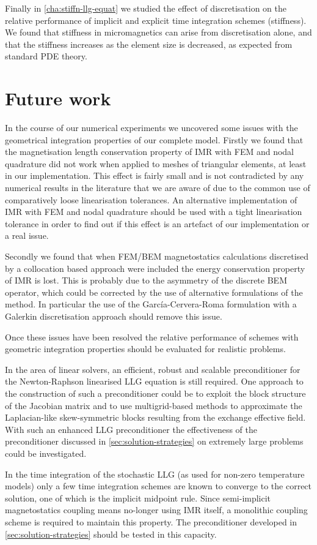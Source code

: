 Finally in \cref{cha:stiffn-llg-equat} we studied the effect of discretisation on the relative performance of implicit and explicit time integration schemes (stiffness).
We found that stiffness in micromagnetics can arise from discretisation alone, and that the stiffness increases as the element size is decreased, as expected from standard PDE theory.



\section{Future work}


In the course of our numerical experiments we uncovered some issues with the geometrical integration properties of our complete model.
Firstly we found that the magnetisation length conservation property of IMR with FEM and nodal quadrature did not work when applied to meshes of triangular elements, at least in our implementation.
This effect is fairly small and is not contradicted by any numerical results in the literature that we are aware of due to the common use of comparatively loose linearisation tolerances.
An alternative implementation of IMR with FEM and nodal quadrature should be used with a tight linearisation tolerance in order to find out if this effect is an artefact of our implementation or a real issue.

Secondly we found that when FEM/BEM magnetostatics calculations discretised by a collocation based approach were included the energy conservation property of IMR is lost.
This is probably due to the asymmetry of the discrete BEM operator, which could be corrected by the use of alternative formulations of the method.
In particular the use of the Garc\'{i}a-Cervera-Roma formulation \cite{Garcia-Cervera2006} with a Galerkin discretisation approach \cite[75]{Wrobel2002} should remove this issue.

Once these issues have been resolved the relative performance of schemes with geometric integration properties should be evaluated for realistic problems.

In the area of linear solvers, an efficient, robust and scalable preconditioner for the Newton-Raphson linearised LLG equation is still required.
One approach to the construction of such a preconditioner could be to exploit the block structure of the Jacobian matrix and to use multigrid-based methods to approximate the Laplacian-like skew-symmetric blocks resulting from the exchange effective field.
With such an enhanced LLG preconditioner the effectiveness of the preconditioner discussed in \cref{sec:solution-strategies} on extremely large problems could be investigated.

In the time integration of the stochastic LLG (as used for non-zero temperature models)
only a few time integration schemes are known to converge to the correct solution, one of which is the implicit midpoint rule.
Since semi-implicit magnetostatics coupling means no-longer using IMR itself, a monolithic coupling scheme is required to maintain this property.
The preconditioner developed in \cref{sec:solution-strategies} should be tested in this capacity.



